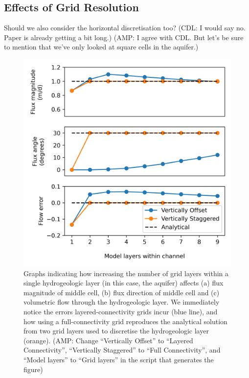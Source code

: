 \documentclass{article}
\begin{document}
\subsection{Effects of Grid Resolution}

{\color{red} Should we also consider the horizontal discretisation too? (CDL: I would say no.  Paper is already getting a bit long.) (AMP: I agree with CDL.  But let's be sure to mention that we've only looked at square cells in the aquifer.)}

\begin{figure}
	\begin{center}
	\includegraphics[scale=0.9]{../figures/fig3paper.png}
	\caption{Graphs indicating how increasing the number of grid layers within a single hydrogeologic layer (in this case, the aquifer) affects (a) flux magnitude of middle cell, (b) flux direction of middle cell and (c) volumetric flow through the hydrogeologic layer. We immediately notice the errors layered-connectivity grids incur (blue line), and how using a full-connectivity grid reproduces the analytical solution from two grid layers used to discretise the hydrogeologic layer (orange). {\color{red} (AMP: Change ``Vertically Offset'' to ``Layered Connectivity'', ``Vertically Staggered'' to ``Full Connectivity'', and ``Model layers'' to ``Grid layers'' in the script that generates the figure)}}
	\label{fig:fig3}
	\end{center}
\end{figure}
\end{document}
